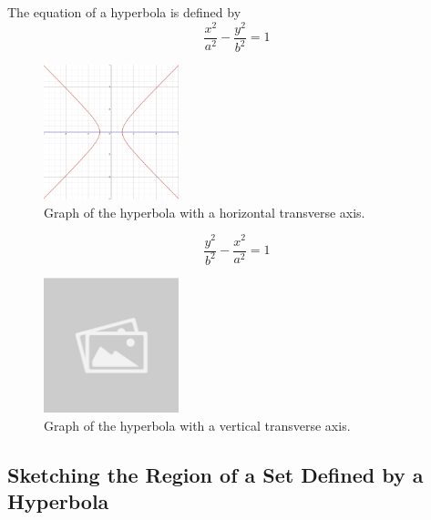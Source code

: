 \documentclass{article}
\begin{document}
\begin{definitionbox}
The equation of a hyperbola is defined by
\[
    \dfrac{x^2}{a^2} - \dfrac{y^2}{b^2} = 1
\]

\begin{figure}[H]
    \centering
    \includegraphics[width=0.35\textwidth]{hyperbola horizontal transverse axis.png}
    \caption{Graph of the hyperbola with a horizontal transverse axis.}
    \label{fig:horizontal_hyperbola}
\end{figure}

\[
    \dfrac{y^2}{b^2} - \dfrac{x^2}{a^2} = 1
\]

\begin{figure}[H]
    \centering
    \includegraphics[width=0.35\textwidth]{sample_image.jpg}
    \caption{Graph of the hyperbola with a vertical transverse axis.}
    \label{fig:vertical_hyperbola}
\end{figure}

\end{definitionbox}

\subsection*{Sketching the Region of a Set Defined by a Hyperbola}
\end{document}
